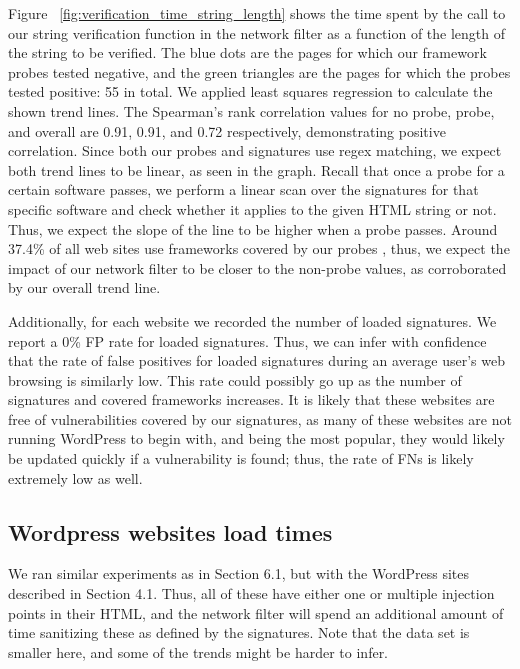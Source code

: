  Figure ~\ref{fig:verification_time_string_length} shows the time spent by the call to our string verification function in the network filter as a function of the length of the string to be verified. The blue dots are the pages for which our framework probes tested negative, and the green triangles are the pages for which the probes tested positive: 55 in total. We applied least squares regression to calculate the shown trend lines. The Spearman's rank correlation values for no probe, probe, and overall are 0.91, 0.91, and 0.72 respectively, demonstrating positive correlation. Since both our probes and signatures use regex matching, we expect both trend lines to be linear, as seen in the graph. Recall that once a probe for a certain software passes, we perform a linear scan over the signatures for that specific software and check whether it applies to the given HTML string or not. Thus, we expect the slope of the line to be higher when a probe passes. Around 37.4\% of all web sites use frameworks covered by our probes \cite{w3stats}, thus, we expect the impact of our network filter to be closer to the non-probe values, as corroborated by our overall trend line.

Additionally, for each website we recorded the number of loaded signatures. We report a 0\% FP rate for loaded signatures. Thus, we can infer with confidence that the rate of false positives for loaded signatures during an average user's web browsing is similarly low. This rate could possibly go up as the number of signatures and covered frameworks increases. It is likely that these websites are free of vulnerabilities covered by our signatures, as many of these websites are not running WordPress to begin with, and being the most popular, they would likely be updated quickly if a vulnerability is found; thus, the rate of FNs is likely extremely low as well.

\subsection{Wordpress websites load times} \label{wordpress_sites}

We ran similar experiments as in Section 6.1, but with the WordPress sites described in Section 4.1. Thus, all of these have either one or multiple injection points in their HTML, and the network filter will spend an additional amount of time sanitizing these as defined by the signatures. Note that the data set is smaller here, and some of the trends might be harder to infer. 

